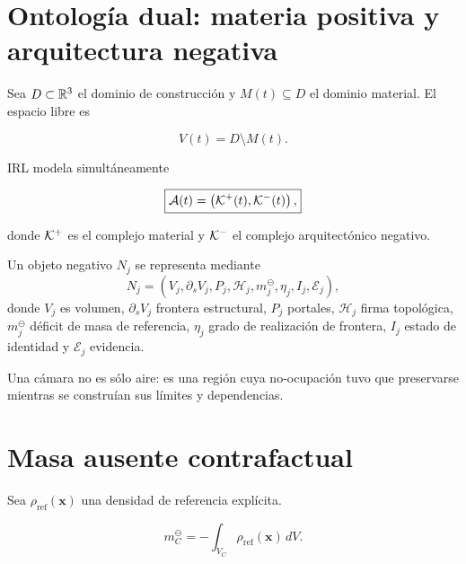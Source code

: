 
\section{Ontología dual: materia positiva y arquitectura negativa}

Sea \(D\subset\mathbb R^3\) el dominio de construcción y \(M(t)\subseteq D\) el dominio material. El espacio libre es

\begin{equation}
V(t)=D\setminus M(t).
\end{equation}

IRL modela simultáneamente

\begin{equation}
\boxed{
\mathcal A(t)
=
\left(
\mathcal K^{+}(t),
\mathcal K^{-}(t)
\right),
}
\end{equation}

donde \(\mathcal K^{+}\) es el complejo material y \(\mathcal K^{-}\) el complejo arquitectónico negativo.

\begin{definition}
Un objeto negativo \(N_j\) se representa mediante
\begin{equation}
N_j
=
\left(
V_j,
\partial_sV_j,
P_j,
\mathcal H_j,
m_j^\ominus,
\eta_j,
I_j,
\mathcal E_j
\right),
\end{equation}
donde \(V_j\) es volumen, \(\partial_sV_j\) frontera estructural, \(P_j\) portales, \(\mathcal H_j\) firma topológica, \(m_j^\ominus\) déficit de masa de referencia, \(\eta_j\) grado de realización de frontera, \(I_j\) estado de identidad y \(\mathcal E_j\) evidencia.
\end{definition}

Una cámara no es sólo aire: es una región cuya no-ocupación tuvo que preservarse mientras se construían sus límites y dependencias.

\section{Masa ausente contrafactual}

Sea \(\rho_{\mathrm{ref}}(\mathbf x)\) una densidad de referencia explícita.

\begin{definition}
\begin{equation}
\boxed{
m_C^\ominus
=
-\int_{V_C}
\rho_{\mathrm{ref}}(\mathbf x)\,dV.
}
\end{equation}
\end{definition}

